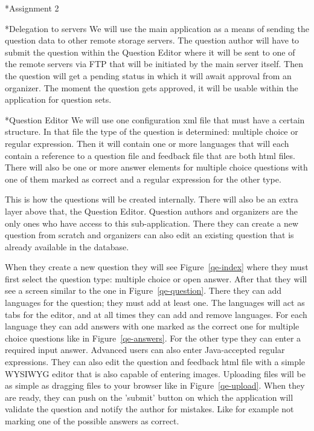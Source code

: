 \begin{section}*{Assignment 2}
    \begin{subsection}*{Delegation to servers}
        We will use the main application as a means of sending the question data to other
        remote storage servers. The question author will have to submit the question within
        the Question Editor where it will be sent to one of the remote servers via FTP that
        will be initiated by the main server itself. Then the question will get a
        pending status in which it will await approval from an organizer. The moment
        the question gets approved, it will be usable within the application for question
        sets.
    \end{subsection}
    
    \begin{subsection}*{Question Editor}
        We will use one configuration xml file that must have a certain structure. In
        that file the type of the question is determined: multiple choice or regular
        expression. Then it will contain one or more languages that will each contain a
        reference to a question file and feedback file that are both html files. There
        will also be one or more answer elements for multiple choice questions with one
        of them marked as correct and a regular expression for the other type.
        
        This is how the questions will be created internally. There will also be an extra
        layer above that, the Question Editor.
        Question authors and organizers are the only ones who have access to this
        sub-application. There they can create a new question from scratch and organizers
        can also edit an existing question that is already available in the database.
        
        When they create a new question they will see Figure~\ref{qe-index} where they
        must first select the question type:
        multiple choice or open answer. After that they will see a screen similar to the
        one in Figure~\ref{qe-question}. There they can add languages for the question; they must add at
        least one. The languages will act as tabs for the editor, and at all times they
        can add and remove languages. For each language they can add answers with
        one marked as the correct one for multiple choice questions like in Figure~\ref{qe-answers}.
        For the other type they can enter a required input answer. Advanced users can also
        enter Java-accepted regular expressions. They can also edit the question and feedback html file
        with a simple WYSIWYG editor that is also capable of entering images. Uploading
        files will be as simple as dragging files to your browser like in Figure~\ref{qe-upload}.
        When they are ready, they can push on the 'submit' button on which the application
        will validate the question and notify the author for mistakes. Like for example
        not marking one of the possible answers as correct.
        

\end{subsection}
\end{section}
